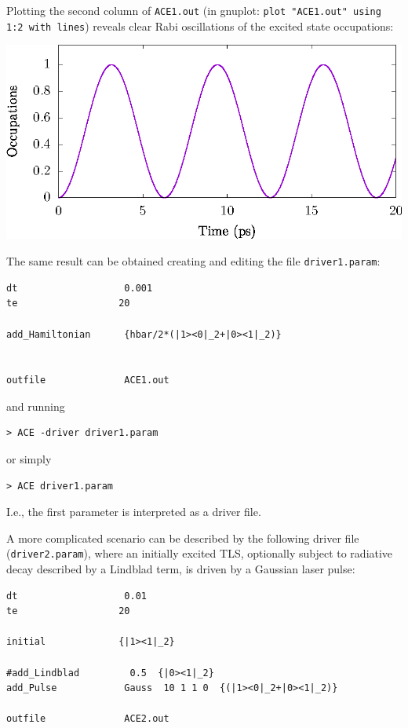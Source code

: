 \documentclass{scrartcl}
\begin{document}
Plotting the second column of \texttt{ACE1.out} 
(in gnuplot: \verb+plot "ACE1.out" using 1:2 with lines+) reveals clear 
Rabi oscillations of the excited state occupations:

\includegraphics[width=20cm]{figs/example1.eps}

The same result can be obtained creating and editing the file 
\texttt{driver1.param}:


\noindent\makebox[5cm]{\rule{7cm}{0.4pt}}
\begin{verbatim}
dt                   0.001 
te                  20 

add_Hamiltonian      {hbar/2*(|1><0|_2+|0><1|_2)}


outfile              ACE1.out
\end{verbatim}
\noindent\makebox[5cm]{\rule{7cm}{0.4pt}}

and running
\begin{verbatim}
> ACE -driver driver1.param
\end{verbatim}
or simply 
\begin{verbatim}
> ACE driver1.param
\end{verbatim}
I.e., the first parameter is interpreted as a driver file.

A more complicated scenario can be described by the 
following driver file (\verb+driver2.param+), where an initially excited 
TLS, optionally subject to radiative decay described by a 
Lindblad term, is driven by a Gaussian laser pulse:

\noindent\makebox[5cm]{\rule{7cm}{0.4pt}}
\begin{verbatim}
dt                   0.01
te                  20

initial             {|1><1|_2}

#add_Lindblad         0.5  {|0><1|_2}
add_Pulse            Gauss  10 1 1 0  {(|1><0|_2+|0><1|_2)}

outfile              ACE2.out
\end{verbatim}
\noindent\makebox[5cm]{\rule{7cm}{0.4pt}}
\end{document}
